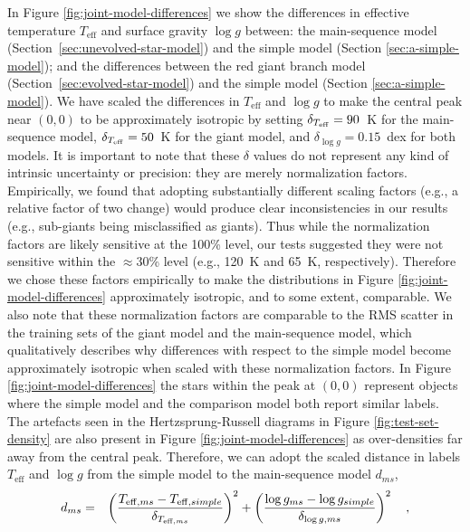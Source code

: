 \documentclass[preprint]{aastex}
\newcommand{\teff}{T_{\mathrm{eff}}}
\newcommand{\logg}{\log g}
\begin{document}
In Figure \ref{fig:joint-model-differences} we show the differences in effective 
temperature $\teff$ and surface gravity $\logg$ between: the main-sequence model 
(Section~\ref{sec:unevolved-star-model}) and the simple model (Section 
\ref{sec:a-simple-model}); and the differences between the red giant branch model 
(Section~\ref{sec:evolved-star-model}) and the simple model (Section 
\ref{sec:a-simple-model}).  We have scaled the differences in $\teff$ and $\logg$ 
to make the central peak near $(0, 0)$ to be approximately isotropic by setting
	$\delta_{T_{\rm eff}} = 90$~K for the main-sequence model, 
	$\delta_{T_{\rm eff}} = 50$~K for the giant model, and 
	$\delta_{\log{g}} = 0.15$~dex for both models.
It is important to note that these $\delta$ values do not represent any kind of 
intrinsic uncertainty or precision: they are merely normalization factors.  
Empirically, we found that adopting substantially different scaling factors (e.g.,
a relative factor of two change) would produce clear inconsistencies in our results (e.g.,
sub-giants being misclassified as giants). Thus while the normalization factors
are likely sensitive at the 100\% level, our tests suggested they were not
sensitive within the $\approx$30\% level (e.g., 120~K and 65~K, respectively). Therefore we 
chose these factors empirically to make the distributions in Figure \ref{fig:joint-model-differences}
approximately isotropic, and to some extent, comparable. We also note that
these normalization factors are comparable to the RMS scatter in the training sets
of the giant model and the main-sequence model, which qualitatively describes why 
differences with respect to the simple model become approximately isotropic when
scaled with these normalization factors.  In Figure 
\ref{fig:joint-model-differences} the stars within the peak at $(0, 0)$ represent 
objects where the simple model and the comparison model both report similar labels.  
The artefacts seen in the Hertzsprung-Russell diagrams in Figure \ref{fig:test-set-density} 
are also present in Figure \ref{fig:joint-model-differences} as over-densities far away
from the central peak.  Therefore, we can adopt the scaled distance in labels 
$\teff$ and $\logg$ from the simple model to the main-sequence model $d_{ms}$,
\begin{eqnarray}
	d_{ms} & = & \left(\frac{T_{{\rm eff},ms} - T_{{\rm eff},simple}}{\delta_{T_{{\rm eff},ms}}}\right)^2 + \left(\frac{\log{g}_{ms} - \log{g}_{simple}}{\delta_{\log{g},ms}}\right)^2 \quad ,
\end{eqnarray}
\end{document}
